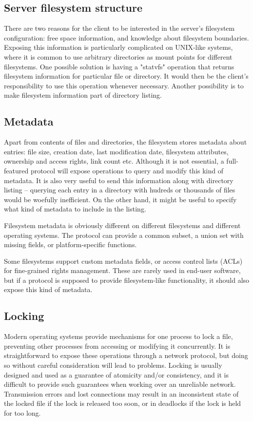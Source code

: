 \subsection{Server filesystem structure}

There are two reasons for the client to be interested in the server's filesystem configuration: free space
information, and knowledge about filesystem boundaries. Exposing this information is particularly complicated
on UNIX-like systems, where it is common to use arbitrary directories as mount points for different
filesystems. One possible solution is having a "statvfs"\cite{statvfs} operation that returns filesystem
information for particular file or directory. It would then be the client's responsibility to use this
operation whenever necessary. Another possibility is to make filesystem information part of directory listing.

\subsection{Metadata}

Apart from contents of files and directories, the filesystem stores metadata about entries: file size,
creation date, last modification date, filesystem attributes, ownership and access rights, link count etc.
Although it is not essential, a full-featured protocol will expose operations to query and modify this kind of
metadata. It is also very useful to send this information along with directory listing -- querying each entry
in a directory with hudreds or thousands of files would be woefully inefficient. On the other hand, it might
be useful to specify what kind of metadata to include in the listing.

Filesystem metadata is obviously different on different filesystems and different operating systems. The
protocol can provide a common subset, a union set with missing fields, or platform-specific functions.

Some filesystems support custom metadata fields, or access control lists (ACLs) for fine-grained rights
management. These are rarely used in end-user software, but if a protocol is supposed to provide
filesystem-like functionality, it should also expose this kind of metadata.

\subsection{Locking}

Modern operating systems provide mechanisms for one process to lock a file, preventing other processes from
accessing or modifying it concurrently. It is straightforward to expose these operations through a network
protocol, but doing so without careful consideration will lead to problems. Locking is usually designed and
used as a guarantee of atomicity and/or consistency, and it is difficult to provide such guarantees when
working over an unreliable network. Transmission errors and lost connections may result in an inconsistent
state of the locked file if the lock is released too soon, or in deadlocks if the lock is held for too long.

